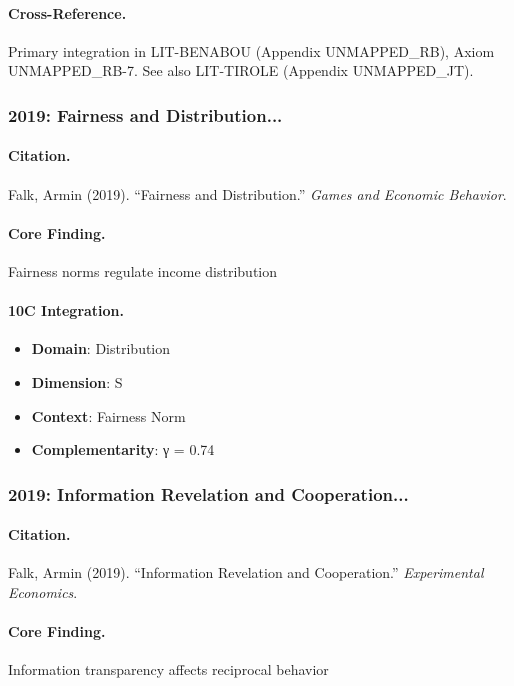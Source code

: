 \paragraph{Cross-Reference.}
Primary integration in LIT-BENABOU (Appendix UNMAPPED_RB), Axiom UNMAPPED_RB-7. See also LIT-TIROLE (Appendix UNMAPPED_JT).


\subsubsection{2019: Fairness and Distribution...}

\paragraph{Citation.}
Falk, Armin (2019). ``Fairness and Distribution.''
\textit{Games and Economic Behavior}.

\paragraph{Core Finding.}
Fairness norms regulate income distribution

\paragraph{10C Integration.}
\begin{itemize}[nosep]
  \item \textbf{Domain}: Distribution
  \item \textbf{Dimension}: S
  \item \textbf{Context}: Fairness Norm
  \item \textbf{Complementarity}: γ = 0.74
\end{itemize}


\subsubsection{2019: Information Revelation and Cooperation...}

\paragraph{Citation.}
Falk, Armin (2019). ``Information Revelation and Cooperation.''
\textit{Experimental Economics}.

\paragraph{Core Finding.}
Information transparency affects reciprocal behavior

